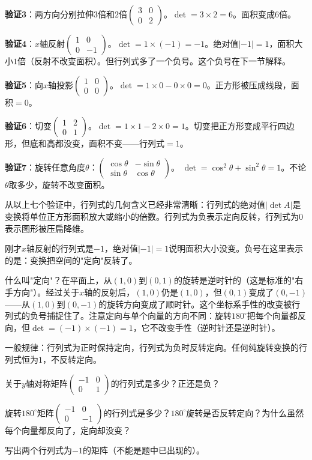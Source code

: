 \textbf{验证3}：两方向分别拉伸$3$倍和$2$倍$\begin{pmatrix}3&0\\0&2\end{pmatrix}$。$\det=3\times2=6$。面积变成$6$倍。

\textbf{验证4}：$x$轴反射$\begin{pmatrix}1&0\\0&-1\end{pmatrix}$。$\det=1\times(-1)=-1$。绝对值$|-1|=1$，面积大小$1$倍（反射不改变面积）。但行列式多了一个负号。这个负号在下一节解释。

\textbf{验证5}：向$x$轴投影$\begin{pmatrix}1&0\\0&0\end{pmatrix}$。$\det=1\times0-0\times0=0$。正方形被压成线段，面积$=0$。

\textbf{验证6}：切变$\begin{pmatrix}1&2\\0&1\end{pmatrix}$。$\det=1\times1-2\times0=1$。切变把正方形变成平行四边形，但底和高都没变，面积不变——行列式$=1$。

\textbf{验证7}：旋转任意角度$\theta$：$\begin{pmatrix}\cos\theta&-\sin\theta\\\sin\theta&\cos\theta\end{pmatrix}$。
$\det=\cos^2\theta+\sin^2\theta=1$。不论$\theta$取多少，旋转不改变面积。

从以上七个验证中，行列式的几何含义已经非常清晰：行列式的绝对值$|\det A|$是变换将单位正方形面积放大或缩小的倍数。行列式为负表示定向反转，行列式为$0$表示图形被压扁降维。


刚才$x$轴反射的行列式是$-1$，绝对值$|-1|=1$说明面积大小没变。负号在这里表示的是：变换把空间的"定向"反转了。

什么叫"定向"？在平面上，从$(1,0)$到$(0,1)$的旋转是逆时针的（这是标准的"右手方向"）。经过关于$x$轴的反射后，$(1,0)$仍是$(1,0)$，但$(0,1)$变成了$(0,-1)$——从$(1,0)$到$(0,-1)$的旋转方向变成了顺时针。这个坐标系手性的改变被行列式的负号捕捉住了。注意定向与单个向量的方向不同：旋转$180^\circ$把每个向量都反向，但$\det=(-1)\times(-1)=1$，它不改变手性（逆时针还是逆时针）。

一般规律：行列式为正时保持定向，行列式为负时反转定向。任何纯旋转变换的行列式恒为$1$，不反转定向。

\begin{exercise}
\item 关于$y$轴对称矩阵$\begin{pmatrix}-1&0\\0&1\end{pmatrix}$的行列式是多少？正还是负？
\item 旋转$180^\circ$矩阵$\begin{pmatrix}-1&0\\0&-1\end{pmatrix}$的行列式是多少？$180^\circ$旋转是否反转定向？为什么虽然每个向量都反向了，定向却没变？
\item 写出两个行列式为$-1$的矩阵（不能是题中已出现的）。
\end{exercise}

